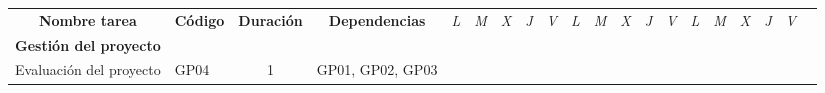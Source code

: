 \begin{longtable}[c]{llclllllllllllllllll}
        \multicolumn{1}{|c|}{\multirow{-2}{*}{\cellcolor[HTML]{FFFFFF}\textbf{Nombre tarea}}} & \multicolumn{1}{c|}{\multirow{-2}{*}{\cellcolor[HTML]{FFFFFF}\textbf{Código}}} & \multicolumn{1}{c|}{\multirow{-2}{*}{\cellcolor[HTML]{FFFFFF}\textbf{Duración}}} & \multicolumn{1}{c|}{\multirow{-2}{*}{\cellcolor[HTML]{FFFFFF}\textbf{Dependencias}}} & \multicolumn{1}{l|}{\textit{L}} & \multicolumn{1}{l|}{\textit{M}} & \multicolumn{1}{l|}{\textit{X}} & \multicolumn{1}{l|}{\textit{J}} & \multicolumn{1}{l|}{\textit{V}} & \multicolumn{1}{l|}{\textit{L}} & \multicolumn{1}{l|}{\textit{M}} & \multicolumn{1}{l|}{\textit{X}} & \multicolumn{1}{l|}{\textit{J}} & \multicolumn{1}{l|}{\textit{V}} & \multicolumn{1}{l|}{\textit{L}} & \multicolumn{1}{l|}{\textit{M}} & \multicolumn{1}{l|}{\textit{X}} & \multicolumn{1}{l|}{\textit{J}} & \multicolumn{1}{l|}{\textit{V}}               &  \\ \cline{1-19}
        \multicolumn{4}{|l|}{\textbf{Gestión del proyecto}}                                                                                                                                                                                                                                                                                              & \multicolumn{15}{l|}{}                                                                                                                                                                                                                                                                                                                                                                                                                                                                                                                    &  \\ \cline{1-19}
        \multicolumn{1}{|l|}{Evaluación del proyecto}                                         & \multicolumn{1}{l|}{GP04}                                                      & \multicolumn{1}{c|}{1}                                                           & \multicolumn{1}{l|}{GP01, GP02, GP03}                                                & \cellcolor[HTML]{C6E0B4}        & \cellcolor[HTML]{C6E0B4}        & \cellcolor[HTML]{C6E0B4}        & \cellcolor[HTML]{C6E0B4}        & \cellcolor[HTML]{C6E0B4}        &                                 &                                 &                                 &                                 &                                 &                                 &                                 &                                 &                                 & \multicolumn{1}{l|}{}                         &  \\ \cline{1-4}

\end{longtable}
